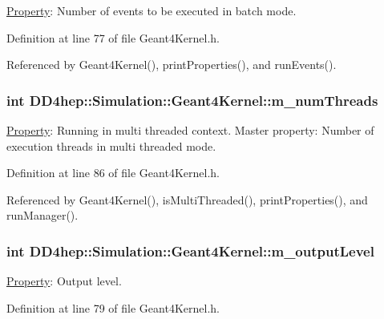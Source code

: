 \hyperlink{class_d_d4hep_1_1_property}{Property}: Number of events to be executed in batch mode. 

Definition at line 77 of file Geant4Kernel.h.

Referenced by Geant4Kernel(), printProperties(), and runEvents().\hypertarget{class_d_d4hep_1_1_simulation_1_1_geant4_kernel_a402cfabce5a04002713b4e35569911d7}{
\subsubsection[{m\_\-numThreads}]{\setlength{\rightskip}{0pt plus 5cm}int {\bf DD4hep::Simulation::Geant4Kernel::m\_\-numThreads}}}
\label{class_d_d4hep_1_1_simulation_1_1_geant4_kernel_a402cfabce5a04002713b4e35569911d7}


\hyperlink{class_d_d4hep_1_1_property}{Property}: Running in multi threaded context. Master property: Number of execution threads in multi threaded mode. 

Definition at line 86 of file Geant4Kernel.h.

Referenced by Geant4Kernel(), isMultiThreaded(), printProperties(), and runManager().\hypertarget{class_d_d4hep_1_1_simulation_1_1_geant4_kernel_a419eed43ed023a0b43a2ddc44f474708}{
\subsubsection[{m\_\-outputLevel}]{\setlength{\rightskip}{0pt plus 5cm}int {\bf DD4hep::Simulation::Geant4Kernel::m\_\-outputLevel}}}
\label{class_d_d4hep_1_1_simulation_1_1_geant4_kernel_a419eed43ed023a0b43a2ddc44f474708}


\hyperlink{class_d_d4hep_1_1_property}{Property}: Output level. 

Definition at line 79 of file Geant4Kernel.h.

